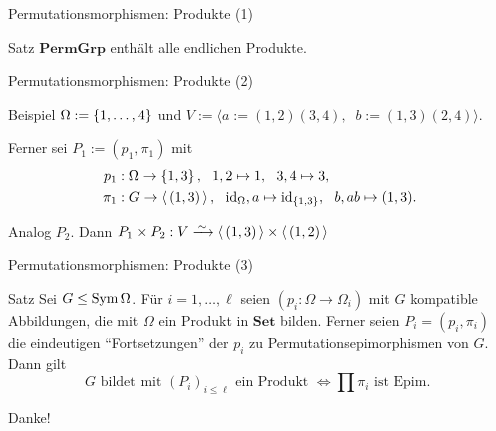 
\begin{frame}{Permutationsmorphismen: Produkte (1)}
\begin{block}{Satz}
$\mathbf{PermGrp}$ enthält alle endlichen Produkte.
\end{block}
\end{frame}

\begin{frame}{Permutationsmorphismen: Produkte (2)}
\begin{block}{Beispiel}
$\Omega :=  \left\{ 1, \ldots, 4 \right\} $ und
$V := \langle a := (1,2)(3,4),~$%
$b := (1,3)(2,4) \rangle$.

\begin{figure}[H]
\centering
{}
\end{figure}

Ferner sei
$P_1 := (p_1, \pi_1)$ mit
\begin{align*}
p_1 &: \Omega \rightarrow  \left\{ 1,3 \right\} ,~~
1,2 \mapsto 1, ~~ 3,4 \mapsto 3,
\\
\pi_1 &: G \rightarrow  \left\langle \, (1,3) \, \right\rangle ,~~
\operatorname{id}_\Omega, a \mapsto \operatorname{id}_{ \left\{ 1,3 \right\} },
~~b, ab \mapsto (1,3).
\end{align*}

Analog $P_2$.
Dann $P_1 \times P_2 : V \iso \gen{(1,3)} \times \gen{(1,2)}$
\end{block}
\end{frame}

\begin{frame}{Permutationsmorphismen: Produkte (3)}
\begin{block}{Satz}
Sei $G \leq \operatorname{Sym} \Omega$.
Für $i = 1, \ldots, \ell$
seien
$(p_i : \Omega \to \Omega_i)$
mit $G$ kompatible Abbildungen,
\pause
die mit $\Omega$ ein Produkt in
$\mathbf{Set}$ bilden.
\pause
Ferner seien
$P_i = (p_i, \pi_i)$ die eindeutigen ``Fortsetzungen'' der $p_i$ zu
Permutationsepimorphismen
von $G$.
\pause
Dann gilt
\[
G \text{ bildet mit } (P_i)_{i \leq \ell} \text{ ein Produkt }
\iff
\prod \pi_i \text{ ist Epim. }
\]
\end{block}
\end{frame}


\begin{frame}[standout]
Danke!
\end{frame}
